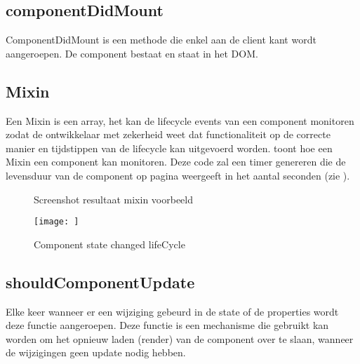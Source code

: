 	\subsection{componentDidMount}
		
		ComponentDidMount is een methode die enkel aan de client kant wordt aangeroepen. De component bestaat en staat in het DOM.
	
	\subsection{Mixin}
		
		Een Mixin is een array, het kan de lifecycle events van een component monitoren zodat de ontwikkelaar met zekerheid weet dat functionaliteit op de correcte manier en tijdstippen van de lifecycle kan uitgevoerd worden.  toont hoe een Mixin een component kan monitoren. Deze code zal een timer genereren die de levensduur van de component op pagina weergeeft in het aantal seconden (zie ).
		
		
		\begin{figure}
			\centering
			\caption{Screenshot resultaat mixin voorbeeld}%
			\label{fig:timer}%
		\end{figure}
		
		\begin{figure}
			\centering
			\texttt{[image: ]}%
			\caption{Component state changed lifeCycle}%
			\label{fig:changedlifecycle}%
		\end{figure}
	
	\subsection{shouldComponentUpdate}
		
		Elke keer wanneer er een wijziging gebeurd in de state of de properties wordt deze functie aangeroepen. Deze functie is een mechanisme die gebruikt kan worden om het opnieuw laden (render) van de component over te slaan, wanneer de wijzigingen geen update nodig hebben.
	
